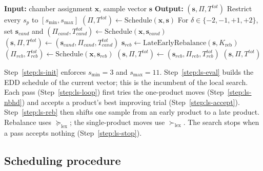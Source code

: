 \documentclass[11pt]{article}
\begin{document}
\begin{algorithm}[H]
\caption{SampleSizeLocalSearch}
\label{alg:sample_ls}
\label{alg:sample_ls_short}
\begin{algorithmic}[1]
\State \textbf{Input:} chamber assignment \(\mathbf{x}\), sample vector \(\mathbf{s}\)
\State \textbf{Output:} \((\mathbf{s},\Pi,T^{tot})\)
\State Restrict every \(s_p\) to \([s_{\min},s_{\max}]\) \label{step:ls-init}
\State \((\Pi,T^{tot})\leftarrow\text{Schedule}(\mathbf{x},\mathbf{s})\) \label{step:ls-eval}
\Repeat \label{step:ls-loop}
        \State For \(\delta\in\{-2,-1,+1,+2\}\), set \(\mathbf{s}_{cand}\) and \((\Pi_{cand},T^{tot}_{cand})\leftarrow\mathrm{Schedule}(\mathbf{x},\mathbf{s}_{cand})\) \label{step:ls-nbhd}
         \label{step:ls-accept}
            \State \((\mathbf{s},\Pi,T^{tot})\leftarrow(\mathbf{s}_{cand},\Pi_{cand},T^{tot}_{cand})\)
        \EndIf
    \EndFor
    \State \(\mathbf{s}_{reb}\leftarrow\text{LateEarlyRebalance}(\mathbf{s},K_{\mathrm{reb}})\) \label{step:ls-reb}
    \State \((\Pi_{reb},T^{tot}_{reb})\leftarrow\mathrm{Schedule}(\mathbf{x},\mathbf{s}_{reb})\)
        \State \((\mathbf{s},\Pi,T^{tot})\leftarrow(\mathbf{s}_{reb},\Pi_{reb},T^{tot}_{reb})\)
    \EndIf
{} \label{step:ls-stop}
\State \Return \((\mathbf{s},\Pi,T^{tot})\)
\end{algorithmic}
\end{algorithm}

Step~\ref{step:ls-init} enforces \(s_{\min}=3\) and \(s_{\max}=11\).
Step~\ref{step:ls-eval} builds the EDD schedule of the current
vector; this is the incumbent of the local search.
Each pass (Step~\ref{step:ls-loop}) first tries the one-product
moves (Step~\ref{step:ls-nbhd}) and accepts a product's best
improving trial (Step~\ref{step:ls-accept}).
Step~\ref{step:ls-reb} then shifts one sample from an early product
to a late product.
Rebalance uses \(\succeq_{\mathrm{lex}}\); the single-product moves use
\(\succ_{\mathrm{lex}}\).
The search stops when a pass accepts nothing
(Step~\ref{step:ls-stop}).

\subsection{Scheduling procedure}
\label{subsec:scheduling_procedure}
\label{subsec:scheduling}
\end{document}
